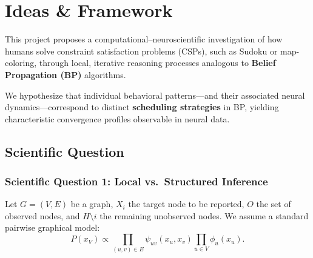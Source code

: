 \section{Ideas \& Framework}
    This project proposes a computational–neuroscientific investigation of how humans solve constraint satisfaction problems (CSPs), such as Sudoku or map-coloring, through local, iterative reasoning processes analogous to \textbf{Belief Propagation (BP)} algorithms.  

    We hypothesize that individual behavioral patterns—and their associated neural dynamics—correspond to distinct \textbf{scheduling strategies} in BP, yielding characteristic convergence profiles observable in neural data.

    \subsection{Scientific Question}
    
%
%        


\subsubsection{Scientific Question 1: Local vs.\ Structured Inference}

Let \(G=(V,E)\) be a graph, \(X_i\) the target node to be reported, \(O\) the set of observed nodes, and \(H\setminus i\) the remaining unobserved nodes. We assume a standard pairwise graphical model:
\[
P(x_V)\propto \prod_{(u,v)\in E}\psi_{uv}(x_u,x_v)\prod_{u\in V}\phi_u(x_u).
\]

